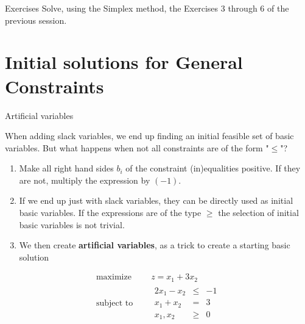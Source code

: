 \documentclass[c]{beamer}
\begin{document}
\begin{frame}{Exercises}
  Solve, using the Simplex method, the Exercises 3 through 6 of the previous session.
\end{frame}

\section{Initial solutions for General Constraints}

\begin{frame}{Artificial variables}

  When adding slack variables, we end up finding an initial feasible set of basic variables. But what happens when not all constraints are of the form "$\leq$"?\cite{carter}

  \begin{enumerate}
    \item Make all right hand sides $b_i$ of the constraint (in)equalities positive. If they are not, multiply the expression by $(-1)$.
    \item If we end up just with slack variables, they can be directly used as initial basic variables. If the expressions are of the type $\geq$ the selection of initial basic variables is not trivial.
    \item We then create {\bf artificial variables}, as a trick to create a starting basic solution
  \end{enumerate}
  \begin{equation*}
    \begin{aligned}
      \text{maximize } \quad & z = x_1+3x_2 \\
      \text{subject to }\quad &
      \begin{array}{rcl}
        2x_1 -x_2 &\leq &-1 \\
        x_1+x_2 &= &3 \\
        x_1,x_2 &\geq& 0
      \end{array}
    \end{aligned}
  \end{equation*}
\end{frame}
\end{document}
